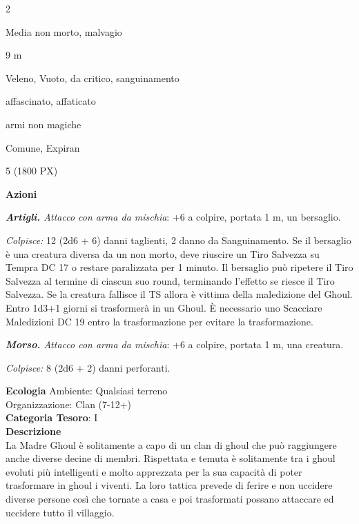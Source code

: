 \begin{multicols}{2}
{
\begin{description}[noitemsep, topsep=0pt, parsep=0pt, partopsep=0pt, itemsep=1pt, leftmargin=2.35cm,  labelwidth=2.2cm, itemindent=0cm, listparindent=0pt] %
\setlength{\baselineskip}{10pt}
\item[\textbf{Taglia/Tipo}] Media non morto, malvagio
\item[\textbf{Caratt.}] 
\item[\textbf{Punti Ferita}] 
\item[\textbf{Movimento}] 9 m
\item[\textbf{Tiri Salvez.}] 
\item[\textbf{Imm. Danni}] Veleno, Vuoto, da critico, sanguinamento
\item[\textbf{Immunità}] affascinato, affaticato
\item[\textbf{Res. Danni}] armi non magiche
\item[\textbf{Sensi}] 
\item[\textbf{Linguaggi}] Comune, Expiran
\item[\textbf{Sfida}] 5 (1800 PX)
\end{description}
\smallskip

\textbf{Azioni}

\emph{\textbf{Artigli.} Attacco con arma da mischia}: +6 a colpire, portata 1 m, un bersaglio.

\emph{Colpisce:} 12 (2d6 + 6) danni taglienti, 2 danno da Sanguinamento. Se il bersaglio è una creatura diversa da un non morto, deve riuscire un Tiro Salvezza su Tempra DC 17 o restare paralizzata per 1 minuto. Il bersaglio può ripetere il Tiro Salvezza al termine di ciascun suo round, terminando l'effetto se riesce il Tiro Salvezza. Se la creatura fallisce il TS allora è vittima della maledizione del Ghoul. Entro 1d3+1 giorni si trasformerà in un Ghoul. È necessario uno Scacciare Maledizioni DC 19 entro la trasformazione per evitare la trasformazione.

\emph{\textbf{Morso.} Attacco con arma da mischia}: +6 a colpire, portata 1 m, una creatura.

\emph{Colpisce:} 8 (2d6 + 2) danni perforanti.

\textbf{Ecologia}
Ambiente: Qualsiasi terreno\\
Organizzazione: Clan (7-12+)\\
\textbf{Categoria Tesoro}: I\\
\textbf{Descrizione}\\
La Madre Ghoul è solitamente a capo di un clan di ghoul che può raggiungere anche diverse decine di membri. Rispettata e temuta è solitamente tra i ghoul evoluti più intelligenti e molto apprezzata per la sua capacità di poter trasformare in ghoul i viventi. La loro tattica prevede di ferire e non uccidere diverse persone così che tornate a casa e poi trasformati possano attaccare ed uccidere tutto il villaggio.

}
\end{multicols}
